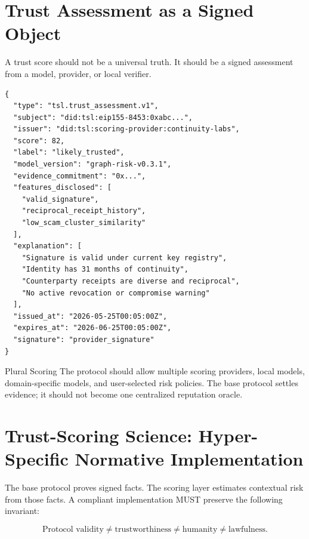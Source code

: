 \documentclass[11pt]{article}
\begin{document}
\section{Trust Assessment as a Signed Object}

A trust score should not be a universal truth. It should be a signed assessment from a model, provider, or local verifier.

\begin{lstlisting}[style=tslcode]
{
  "type": "tsl.trust_assessment.v1",
  "subject": "did:tsl:eip155-8453:0xabc...",
  "issuer": "did:tsl:scoring-provider:continuity-labs",
  "score": 82,
  "label": "likely_trusted",
  "model_version": "graph-risk-v0.3.1",
  "evidence_commitment": "0x...",
  "features_disclosed": [
    "valid_signature",
    "reciprocal_receipt_history",
    "low_scam_cluster_similarity"
  ],
  "explanation": [
    "Signature is valid under current key registry",
    "Identity has 31 months of continuity",
    "Counterparty receipts are diverse and reciprocal",
    "No active revocation or compromise warning"
  ],
  "issued_at": "2026-05-25T00:05:00Z",
  "expires_at": "2026-06-25T00:05:00Z",
  "signature": "provider_signature"
}
\end{lstlisting}

\begin{principlebox}{Plural Scoring}
The protocol should allow multiple scoring providers, local models, domain-specific models, and user-selected risk policies. The base protocol settles evidence; it should not become one centralized reputation oracle.
\end{principlebox}


\section{Trust-Scoring Science: Hyper-Specific Normative Implementation}

The base protocol proves signed facts. The scoring layer estimates contextual risk from those facts. A compliant implementation MUST preserve the following invariant:

\begin{equation}
\text{Protocol validity} \neq \text{trustworthiness} \neq \text{humanity} \neq \text{lawfulness}.
\end{equation}
\end{document}
